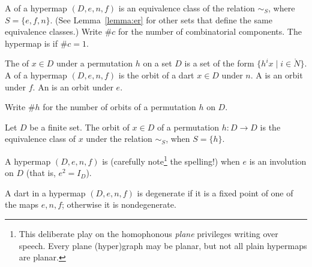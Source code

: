 \begin{definition}
A  of a hypermap $(D,e,n,f)$ is an 
equivalence class of the relation $\sim_S$, where
$S=\{e,f,n\}$. 
(See Lemma~\ref{lemma:er} for other sets that define the same equivalence classes.)  
Write $\#c$ for the
number of combinatorial components.  The hypermap is  if
$\#c=1$.  %
%
%
%
%
\end{definition}





\begin{definition}
The  of $x\in D$ under a permutation $h$ on
a set $D$ is a set of the form $\{h^i x\mid i\in\ring{N}\}$.  A 
of a hypermap $(D,e,n,f)$ is the orbit of a dart $x\in D$ under $n$.  
A  is an orbit under $f$.  
An  is an
orbit under $e$.  %
%
%
\end{definition}

Write $\#h$ for the
number of orbits of a permutation $h$ on $D$.  
%
%


\begin{lemma}
Let $D$ be a finite set.  The orbit of $x\in D$ of a permutation $h:D\to D$
is the equivalence class of $x$ under the relation $\sim_S$, when $S=\{h\}$.
\end{lemma}

\begin{definition}[plain]
A hypermap $(D,e,n,f)$ is 
  (carefully note\footnote{This deliberate play on the homophonous
    {\it plane} privileges writing over speech.  Every plane (hyper)graph may
be planar, but not all plain hypermaps are planar.}
  the  spelling!) when $e$ is an involution on $D$ (that is, $e^2 = I_D$).
\end{definition}




\begin{definition}[degenerate]
 A dart in a hypermap $(D,e,n,f)$ 
is degenerate if it is a
fixed point of one of the maps $e,n,f$; otherwise it is nondegenerate.  
%
%
\end{definition}

